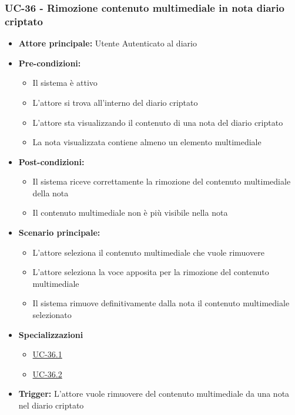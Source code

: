 \documentclass[a4paper,12pt]{article}
\begin{document}
\subsubsection{UC-36 - Rimozione contenuto multimediale in nota diario criptato} \label{subsec:UC-36}
\begin{itemize}
    \item \textbf{Attore principale:} Utente Autenticato al diario
    \item \textbf{Pre-condizioni:}
    \begin{itemize}
        \item Il sistema è attivo
        \item L'attore si trova all'interno del diario criptato
        \item L'attore sta visualizzando il contenuto di una nota del diario criptato
        \item La nota visualizzata contiene almeno un elemento multimediale
    \end{itemize}
    \item \textbf{Post-condizioni:}
    \begin{itemize}
        \item Il sistema riceve correttamente la rimozione del contenuto multimediale della nota
        \item Il contenuto multimediale non è più visibile nella nota
    \end{itemize}
    \item \textbf{Scenario principale:}
    \begin{itemize}
        \item L'attore seleziona il contenuto multimediale che vuole rimuovere
        \item L'attore seleziona la voce apposita per la rimozione del contenuto multimediale
        \item Il sistema rimuove definitivamente dalla nota il contenuto multimediale selezionato
    \end{itemize}
    \item \textbf{Specializzazioni}
    \begin{itemize}
        \item \hyperref[subsec:UC-36.1]{UC-36.1}
        \item \hyperref[subsec:UC-36.2]{UC-36.2}
    \end{itemize}
    \item \textbf{Trigger:} L'attore vuole rimuovere del contenuto multimediale da una nota nel diario criptato
\end{itemize}
\end{document}
